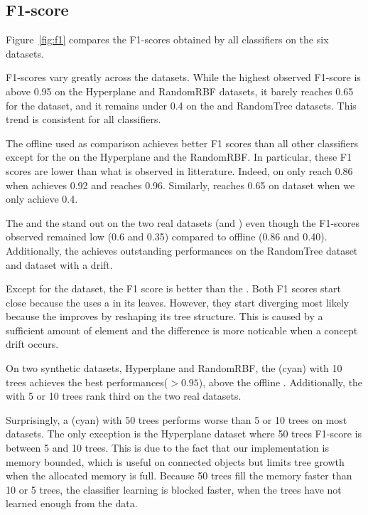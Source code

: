 \subsection{F1-score}
Figure~\ref{fig:f1} compares the F1-scores obtained by all classifiers on the
six datasets.

F1-scores vary greatly across the datasets. While the highest
observed F1-score is above 0.95 on the Hyperplane and RandomRBF datasets,
it barely reaches 0.65 for the \banosdataset dataset, and it remains under
0.4 on the \recofitdataset and RandomTree datasets. This trend is
consistent for all classifiers.

The offline \knn used as comparison achieves better F1 scores than all other
classifiers except for the \mondrianforest on the Hyperplane and the RandomRBF.
In particular, these F1 scores are lower than what is observed in litterature.
Indeed, on \banosdataset \knn only reach 0.86 when \cite{behzad2019} achieves
0.92 and \cite{Banos_2014} reaches 0.96. Similarly, \cite{behzad2019} reaches
0.65 on \recofitdataset dataset when we only achieve 0.4.

The \naivebayes and the \hoeffdingtree stand out on the two real datasets
(\banosdataset and \recofitdataset) even though the F1-scores observed remained
low (0.6 and 0.35) compared to offline \knn (0.86 and 0.40). Additionally, the
\hoeffdingtree achieves outstanding performances on the RandomTree dataset and
\banosdataset dataset with a drift.

Except for the \banosdataset dataset, the \hoeffdingtree F1 score is better than
the \naivebayes. Both F1 scores start close because the \hoeffdingtree uses a
\naivebayes in its leaves.  However, they start diverging most likely because
the \hoeffdingtree improves by reshaping its tree structure.  This is caused by
a sufficient amount of element and the difference is more noticable when a
concept drift occurs.

On two synthetic datasets, Hyperplane and RandomRBF, the \mondrianforest (cyan)
with 10 trees achieves the best performances($> 0.95$), above the offline \knn.
Additionally, the \mondrianforest with 5 or 10 trees rank third on the two real
datasets.

Surprisingly, a \mondrianforest (cyan) with 50 trees performs worse than 5 or 10
trees on most datasets. The only exception is the Hyperplane dataset where
50 trees F1-score is between 5 and 10 trees. This is due to the fact that
our \mondrianforest implementation is memory bounded, which is
useful on connected objects but limits tree growth when the allocated memory is
full. Because 50 trees fill the memory faster than 10 or 5 trees, the
classifier learning is blocked faster, when the trees have not learned enough
from the data.

